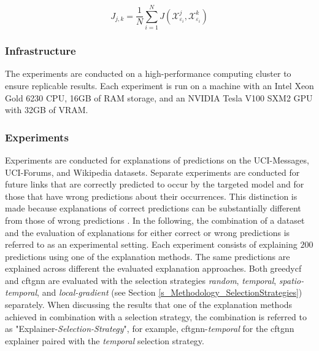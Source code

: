 \begin{equation}
    J_{j,k} = \frac{1}{N} \sum_{i = 1}^N J(\mathcal{X}_{\varepsilon_i}^j, \mathcal{X}_{\varepsilon_i}^k)
\end{equation}




% 

\subsubsection{Infrastructure}
\label{s_Evaluation_Setup_Infrastructure}
The experiments are conducted on a high-performance computing cluster to ensure replicable results. Each experiment is run on a machine with an Intel Xeon Gold 6230 CPU, 16GB of RAM storage, and an NVIDIA Tesla V100 SXM2 GPU with 32GB of VRAM.


\subsubsection{Experiments}
\label{s_Evaluation_Setup_Experiments}

Experiments are conducted for explanations of predictions on the UCI-Messages, UCI-Forums, and Wikipedia datasets. Separate experiments are conducted for future links that are correctly predicted to occur by the targeted model and for those that have wrong predictions about their occurrences. This distinction is made because explanations of correct predictions can be substantially different from those of wrong predictions \cite{amara_graphframex_2022}. In the following, the combination of a dataset and the evaluation of explanations for either correct or wrong predictions is referred to as an experimental setting. Each experiment consists of explaining $200$ predictions using one of the explanation methods. The same predictions are explained across different the evaluated explanation approaches. Both \gls{greedycf} and \gls{cftgnn} are evaluated with the selection strategies \textit{random}, \textit{temporal}, \textit{spatio-temporal}, and \textit{local-gradient} (see Section \ref{s_Methodology_SelectionStrategies}) separately. When discussing the results that one of the explanation methods achieved in combination with a selection strategy, the combination is referred to as "Explainer-\textit{Selection-Strategy}", for example, \gls{cftgnn}-\textit{temporal} for the \gls{cftgnn} explainer paired with the \textit{temporal} selection strategy.

